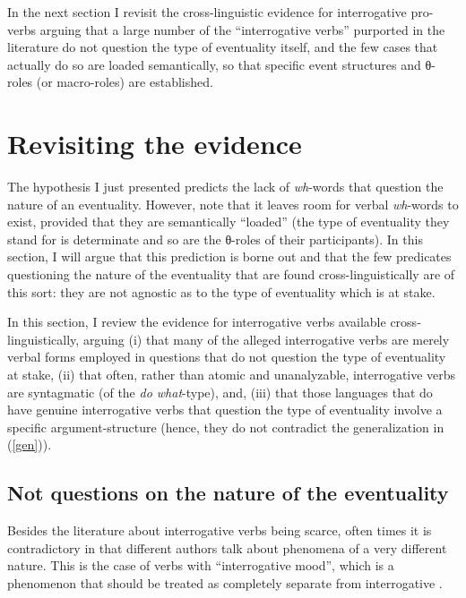 \documentclass[output=paper]{langsci/langscibook}
\begin{document}
In the next section I revisit the cross-linguistic evidence for interrogative
pro-verbs arguing that a large number of the ``interrogative verbs'' purported in the literature do not question the type of eventuality itself, and the few cases that actually do so are loaded semantically, so that specific event structures and θ-roles (or macro-roles) are established.

\section{Revisiting the evidence}
\label{sec:revisiting}

\largerpage[2]
The hypothesis I just presented predicts the lack of \emph{wh}-words that
question the nature of an eventuality. However, note that it leaves room for
verbal \emph{wh}-words to exist, provided that they are semantically ``loaded''
(the type of eventuality they stand for is determinate and so are the θ-roles
of their participants). In this section, I will argue that this prediction is
borne out and that the few predicates questioning the nature of the eventuality
that are found cross-linguistically are of this sort: they are not agnostic as
to the type of eventuality which is at stake.

In this section, I review the evidence for interrogative verbs available
cross-linguistically, arguing (i) that many of the alleged interrogative verbs
are merely verbal forms employed in questions that do not question the type of
eventuality at stake, (ii) that often, rather than atomic and unanalyzable,
interrogative verbs are syntagmatic (of the \emph{do what}-type), and, (iii)
that those languages that do have genuine interrogative verbs that question the
type of eventuality involve a specific argument-structure (hence, they do not
contradict the generalization in (\ref{gen})).

\subsection{Not questions on the nature of the eventuality}
\label{notquestions}

Besides the literature about interrogative verbs being scarce, often times it
is contradictory in that different authors talk about phenomena of a very
different nature. This is the case of verbs with ``interrogative mood'', which is a phenomenon that should be treated as completely  separate from interrogative .
\end{document}
